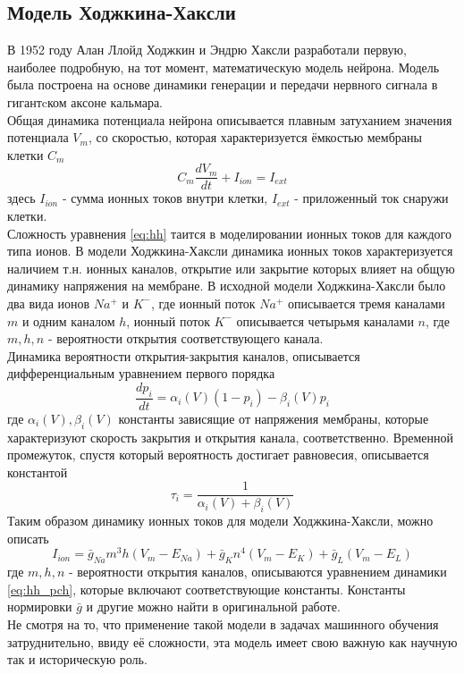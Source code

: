 \documentclass[a4paper,10pt]{article}
\begin{document}
\subsection{Модель Ходжкина-Хаксли}
	В 1952 году Алан Ллойд Ходжкин и Эндрю Хаксли разработали первую, наиболее подробную, на тот момент, математическую модель нейрона. Модель была построена на основе динамики генерации и передачи нервного сигнала в гигантcком аксоне кальмара.\\
	\indent Общая динамика потенциала нейрона описывается плавным затуханием значения потенциала $V_{m}$, со скоростью, которая характеризуется ёмкостью мембраны клетки $C_{m}$
	\begin{equation}\label{eq:hh}
	C_{m}\frac{dV_{m}}{dt}+I_{ion}=I_{ext}
	\end{equation}	 
	здесь $I_{ion}$ - сумма ионных токов внутри клетки, $I_{ext}$ - приложенный ток снаружи клетки.\\
	\indent Сложность уравнения \ref{eq:hh} таится в моделировании ионных токов для каждого типа ионов. В модели Ходжкина-Хаксли динамика ионных токов характеризуется наличием т.н. ионных каналов, открытие или закрытие которых влияет на общую динамику напряжения на мембране. В исходной модели Ходжкина-Хаксли было два вида ионов $Na^{+}$ и $K^{-}$, где ионный поток $Na^{+}$ описывается тремя каналами $m$ и одним каналом $h$, ионный поток $K^{-}$ описывается четырьмя каналами $n$, где $m, h, n$ - вероятности открытия соответствующего канала\cite{Genesis}.\\ 
	\indent Динамика вероятности открытия-закрытия каналов, описывается дифференциальным уравнением первого порядка
	\begin{equation}\label{eq:hh_pch}
	\frac{dp_{i}}{dt} = \alpha_{i}(V)(1-p_{i}) - \beta_{i}(V)p_{i}
	\end{equation}	 
	где $\alpha_{i}(V), \beta_{i}(V)$ константы зависящие от напряжения мембраны, которые характеризуют скорость закрытия и открытия канала, соответственно. Временной промежуток, спустя который вероятность достигает равновесия, описывается константой
	\begin{equation}\label{eq:hh_t}
	\tau_{i}=\frac{1}{\alpha_{i}(V)+\beta_{i}(V)}	
	\end{equation}
	\indent Таким образом динамику ионных токов для модели Ходжкина-Хаксли, можно описать
	\begin{equation}\label{eq:hh_ion}
	I_{ion} = \bar{g}_{Na}m^{3}h(V_{m}-E_{Na}) + \bar{g}_{K}n^{4}(V_{m}-E_{K})+\bar{g}_{L}(V_{m}-E_{L})
	\end{equation}	
	где $m, h, n$ - вероятности открытия каналов, описываются уравнением динамики \ref{eq:hh_pch}, которые включают соответствующие константы. Константы нормировки $\bar{g}$ и другие можно найти в оригинальной работе\cite{HH}.\\
	\indent Не смотря на то, что применение такой модели в задачах машинного обучения затруднительно, ввиду её сложности, эта модель имеет свою важную как  научную так и историческую роль.
   
\end{document}
